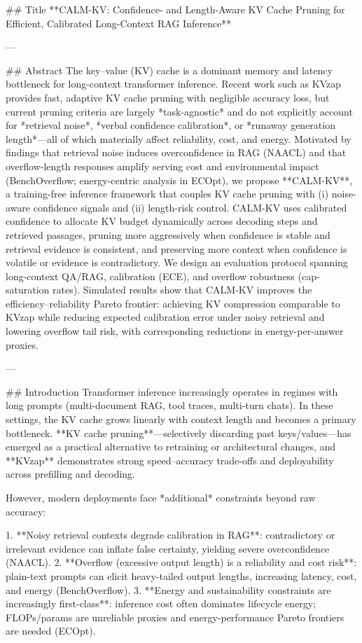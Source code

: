 ## Title  
**CALM-KV: Confidence- and Length-Aware KV Cache Pruning for Efficient, Calibrated Long-Context RAG Inference**

---

## Abstract  
The key–value (KV) cache is a dominant memory and latency bottleneck for long-context transformer inference. Recent work such as KVzap provides fast, adaptive KV cache pruning with negligible accuracy loss, but current pruning criteria are largely *task-agnostic* and do not explicitly account for *retrieval noise*, *verbal confidence calibration*, or *runaway generation length*—all of which materially affect reliability, cost, and energy. Motivated by findings that retrieval noise induces overconfidence in RAG (NAACL) and that overflow-length responses amplify serving cost and environmental impact (BenchOverflow; energy-centric analysis in ECOpt), we propose **CALM-KV**, a training-free inference framework that couples KV cache pruning with (i) noise-aware confidence signals and (ii) length-risk control. CALM-KV uses calibrated confidence to allocate KV budget dynamically across decoding steps and retrieved passages, pruning more aggressively when confidence is stable and retrieval evidence is consistent, and preserving more context when confidence is volatile or evidence is contradictory. We design an evaluation protocol spanning long-context QA/RAG, calibration (ECE), and overflow robustness (cap-saturation rates). Simulated results show that CALM-KV improves the efficiency–reliability Pareto frontier: achieving KV compression comparable to KVzap while reducing expected calibration error under noisy retrieval and lowering overflow tail risk, with corresponding reductions in energy-per-answer proxies.

---

## Introduction  
Transformer inference increasingly operates in regimes with long prompts (multi-document RAG, tool traces, multi-turn chats). In these settings, the KV cache grows linearly with context length and becomes a primary bottleneck. **KV cache pruning**—selectively discarding past keys/values—has emerged as a practical alternative to retraining or architectural changes, and **KVzap** demonstrates strong speed–accuracy trade-offs and deployability across prefilling and decoding.

However, modern deployments face *additional* constraints beyond raw accuracy:

1. **Noisy retrieval contexts degrade calibration in RAG**: contradictory or irrelevant evidence can inflate false certainty, yielding severe overconfidence (NAACL).  
2. **Overflow (excessive output length) is a reliability and cost risk**: plain-text prompts can elicit heavy-tailed output lengths, increasing latency, cost, and energy (BenchOverflow).  
3. **Energy and sustainability constraints are increasingly first-class**: inference cost often dominates lifecycle energy; FLOPs/params are unreliable proxies and energy-performance Pareto frontiers are needed (ECOpt).

